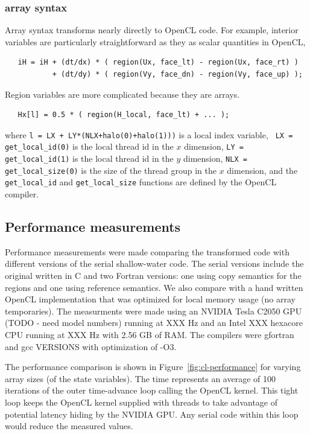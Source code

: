 \subsubsection{array syntax}

Array syntax transforms nearly directly to OpenCL code.  For example, interior
variables are particularly straightforward as they as scalar quantities in
OpenCL,
\begin{verbatim}
   iH = iH + (dt/dx) * ( region(Ux, face_lt) - region(Ux, face_rt) )
           + (dt/dy) * ( region(Vy, face_dn) - region(Vy, face_up) );
\end{verbatim}

Region variables are more complicated because they are arrays.
\begin{verbatim}
   Hx[l] = 0.5 * ( region(H_local, face_lt) + ... );
\end{verbatim}
where {\tt l = LX + LY*(NLX+halo(0)+halo(1)))} is a local index variable, {\tt
  LX = get_local_id(0)} is the local thread id in the $x$ dimension, {\tt LY =
  get_local_id(1)} is the local thread id in the $y$ dimension, {\tt NLX =
  get_local_size(0)} is the size of the thread group in the $x$ dimension, and
the {\tt get_local_id} and {\tt get_local_size} functions are defined by the
OpenCL compiler.


\subsection{Performance measurements}

Performance measurements were made comparing the transformed code with
different versions of the serial shallow-water code.  The serial versions
include the original written in C and two Fortran versions: one using copy
semantics for the regions and one using reference semantics.  We also compare
with a hand written OpenCL implementation that was optimized for local memory
usage (no array temporaries).  The measurments were made using an NVIDIA Tesla C2050
GPU (TODO - need model numbers) running at XXX Hz and an Intel XXX hexacore CPU
running at XXX Hz with 2.56 GB of RAM.  The compilers were gfortran and gcc VERSIONS with
optimization of -O3.

The performance comparison is shown in Figure~\ref{fig:cl-performance} for
varying array sizes (of the state variables).  The time represents an average
of 100 iterations of the outer time-advance loop calling the OpenCL kernel.
This tight loop keeps the OpenCL kernel supplied with threads to take
advantage of potential latency hiding by the NVIDIA GPU.  Any serial code
within this loop would reduce the measured values.

